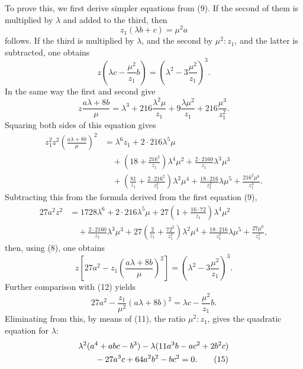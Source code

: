 \documentclass[11pt]{article}
\begin{document}
To prove this, we first derive simpler equations from (9). If the second of them is multiplied by \(\lambda\) and added to the third, then
\begin{equation}
z_1(\lambda b+c)=\mu^2a
\tag{11}
\end{equation}
follows. If the third is multiplied by \(\lambda\), and the second by \(\mu^2:z_1\), and the latter is subtracted, one obtains
\begin{equation}
z\left(\lambda c-\frac{\mu^2}{z_1}b\right)=\left(\lambda^2-3\frac{\mu^2}{z_1}\right)^3.
\tag{12}
\end{equation}
In the same way the first and second give
\[
z\frac{a\lambda+8b}{\mu}=\lambda^3+216\frac{\lambda^2\mu}{z_1}+9\frac{\lambda\mu^2}{z_1}+216\frac{\mu^3}{z_1^2}.
\]
Squaring both sides of this equation gives
\begin{align*}
z_1^2z^2\left(\frac{a\lambda+8b}{\mu}\right)^2
&=\lambda^6z_1+2\cdot216\lambda^5\mu\\
&\quad+\left(18+\frac{216^2}{z_1}\right)\lambda^4\mu^2+\frac{2\cdot2160}{z_1}\lambda^3\mu^3\\
&\quad+\left(\frac{81}{z_1}+\frac{2\cdot216^2}{z_1^2}\right)\lambda^2\mu^4
+\frac{18\cdot216}{z_1^2}\lambda\mu^5+
\frac{216^2\mu^6}{z_1^3}.
\end{align*}
Subtracting this from the formula derived from the first equation (9),
\begin{align*}
27a^2z^2&=1728\lambda^6+2\cdot216\lambda^5\mu+27\left(1+\frac{16\cdot72}{z_1}\right)\lambda^4\mu^2\\
&\quad+\frac{2\cdot2160}{z_1}\lambda^3\mu^3
+27\left(\frac{2}{z_1}+\frac{72^2}{z_1^2}\right)\lambda^2\mu^4
+\frac{18\cdot216}{z_1^2}\lambda\mu^5
+\frac{27\mu^6}{z_1^2},
\end{align*}
then, using (8), one obtains
\begin{equation}
z\left[27a^2-z_1\left(\frac{a\lambda+8b}{\mu}\right)^2\right]=\left(\lambda^2-3\frac{\mu^2}{z_1}\right)^3.
\tag{13}
\end{equation}
Further comparison with (12) yields
\begin{equation}
27a^2-\frac{z_1}{\mu^2}(a\lambda+8b)^2=\lambda c-\frac{\mu^2}{z_1}b.
\tag{14}
\end{equation}
Eliminating from this, by means of (11), the ratio \(\mu^2:z_1\), gives the quadratic equation for \(\lambda\):
\begin{align}
&\lambda^2(a^4+abc-b^3)-\lambda(11a^3b-ac^2+2b^2c)\notag\\
&\qquad -27a^3c+64a^2b^2-bc^2=0.
\tag{15}
\end{align}
\end{document}
